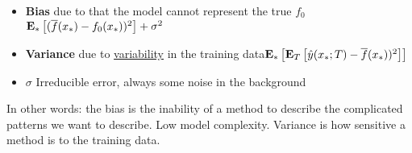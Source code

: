 \begin{itemize}
	\item \textbf{Bias} due to that the model cannot represent the true $f_0$ $\text{\textbf{E}}_* \begin{bmatrix} (\overline{f}(x_*)-f_0(x_*))^{2} \end{bmatrix} + \sigma^{2}$
	\item \textbf{Variance} due to \underline{variability} in the training data$\text{\textbf{E}}_* \begin{bmatrix} \text{\textbf{E}}_T \begin{bmatrix} \hat{y}(x_*;T)-\overline{f}(x_*))^{2} \end{bmatrix} \end{bmatrix}$
	\item \textbf{$\sigma$} Irreducible error, always some noise in the background
\end{itemize}

In other words: the bias is the inability of a method to describe the complicated patterns we want to describe. Low model complexity. Variance is how sensitive a method is to the training data. 

